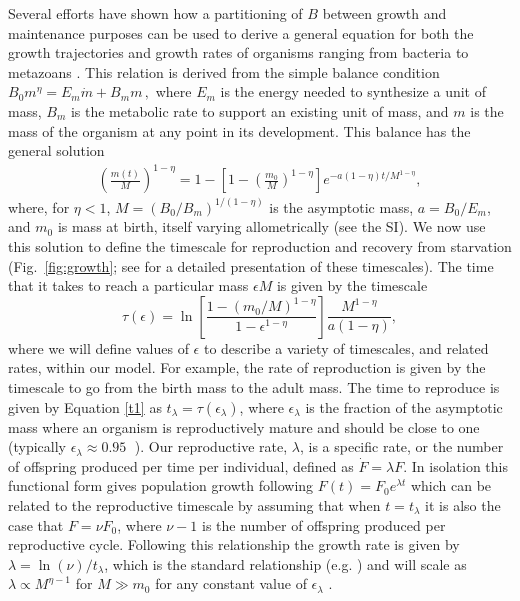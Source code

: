 \documentclass[twocolumn,preprintnumbers,amsmath,amssymb,superscriptaddress]{revtex4}
\begin{document}
{Several efforts have shown how a partitioning of $B$ between growth and
maintenance purposes can be used to derive a general equation for both the
growth trajectories and growth rates of organisms ranging from bacteria to
metazoans
\citep{West:2001bv,moses2008rmo,gillooly2002esa,hou,savage2004effects,Kempes:2012hy}. This relation is derived from the simple balance condition 
$B_{0}m^{\eta}=E_{m}\dot{m}+B_{m}m\,,$
\citep{West:2001bv,moses2008rmo,gillooly2002esa,hou,savage2004effects,Kempes:2012hy} where $E_{m}$ is the energy needed to synthesize a unit of mass, $B_{m}$ is
the metabolic rate to support an existing unit of mass, and $m$ is the mass
of the organism at any point in its development.  This balance has the
general solution \citep{bettencourt,Kempes:2012hy}
\begin{eqnarray}
\label{m1}
\left(\frac{m\left(t\right)}{M}\right)^{1-\eta}\!=1\!-\!\left[1\!-\!\left(\frac{m_{0}}{M}\right)^{1\!-\!\eta}\right]e^{-a\left(1\!-\!\eta\right)t/M^{1-\eta}},
\end{eqnarray}
where, for $\eta<1$, $M=(B_{0}/B_{m})^{1/(1-\eta)}$ is the asymptotic mass,
$a=B_{0}/E_{m}$, and $m_0$ is mass at birth, itself varying allometrically
(see the SI).  We now use this solution to define the timescale for
reproduction and recovery from starvation (Fig.~\ref{fig:growth}; see
\citep{moses2008rmo} for a detailed presentation of these timescales). The
time that it takes to reach a particular mass $\epsilon M$ is given by the
timescale
\begin{equation}
\label{t1}
\tau\left(\epsilon\right) = \ln\left[\frac{1-\left(m_{0}/M\right)^{1-\eta}}{1-\epsilon^{1-\eta}}\right]\frac{M^{1-\eta}}{a\left(1-\eta\right)},
\end{equation}
where we will define values of $\epsilon$ to describe a variety of timescales, and related rates, within
our model.  For example, the rate of reproduction is given by the timescale to go from the birth mass to the adult mass. The time to reproduce is given by Equation \ref{t1} as $t_{\lambda}=\tau\left(\epsilon_{\lambda}\right)$, where $\epsilon_{\lambda}$
is the fraction of the asymptotic mass where an organism is reproductively
mature and should be close to one (typically
$\epsilon_{\lambda}\approx0.95\;$ \citep{West:2001bv}). Our reproductive rate, $\lambda$, is a specific rate, or the number of offspring produced per time per individual, defined as $\dot{F} = \lambda F$. In isolation this functional form gives population growth following $F\left(t\right) = F_{0}e^{\lambda t}$ which can be related to the reproductive timescale by assuming that when $t=t_{\lambda}$ it is also the case that $F=\nu F_{0}$, where $\nu-1$ is the number of offspring produced per reproductive cycle. Following this relationship the growth rate is given by $\lambda=\ln\left(\nu\right)/t_{\lambda}$, which is the standard relationship (e.g. \cite{savage2004effects}) and will scale as $\lambda\propto M^{\eta-1}$ for $M\gg m_{0}$ for any constant value of $\epsilon_{\lambda}$
\citep{West:2001bv,moses2008rmo,gillooly2002esa,hou,Kempes:2012hy}.


}
\end{document}
